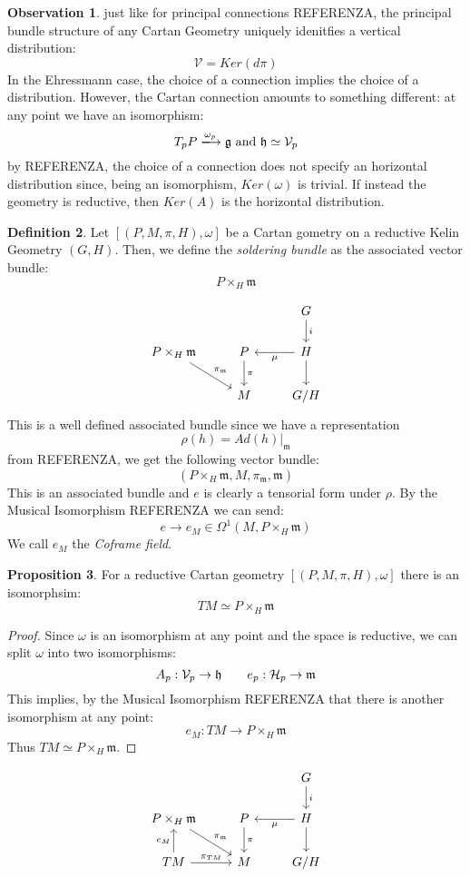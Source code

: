 \documentclass[12pt,a4paper]{report}
\theoremstyle{definition}
\newtheorem{Def}{Definition}[chapter]
\theoremstyle{Theorem}
\newtheorem{Prop}[Def]{Proposition}
\theoremstyle{definition}
\theoremstyle{definition}
\newtheorem{Obs}[Def]{Observation}
\begin{document}
	\begin{Obs}
		just like for principal connections REFERENZA, the principal bundle structure of any Cartan Geometry uniquely idenitfies a vertical distribution:
		$$\mathcal{V}=Ker(d\pi)$$
		In the  Ehressmann case, the choice of a connection implies the choice of a distribution. However, the Cartan connection amounts to something different: at any point we have an isomorphism:
		$$T_pP\xlongrightarrow{\omega_p}\mathfrak{g}\hbox{ and }\mathfrak{h}\simeq\mathcal{V}_p$$ by REFERENZA, the choice of a connection does not specify an horizontal distribution since, being an isomorphism, $Ker(\omega)$ is trivial. If instead the geometry is reductive, then $Ker(A)$ is the horizontal distribution.
	\end{Obs}
	\begin{Def}
		Let $[(P,M,\pi,H),\omega]$ be a Cartan gometry on a reductive Kelin Geometry $(G,H)$. Then, we define the \textit{soldering bundle} as the associated vector bundle:
		$$P\times_{H}\mathfrak{m}$$
	\end{Def}
	$$\begin{tikzcd}
		&& G \arrow{d}{i}\\
		P\times_H \mathfrak{m}\arrow{dr}{\pi_\mathfrak{m}}&P \arrow{d}{\pi} & H \arrow{l}{\mu} \arrow{d}\\
		& M & G/H
	\end{tikzcd}$$
	This is a well defined associated bundle since we have a representation $$\rho(h)=Ad(h)|_\mathfrak{m}$$
	from REFERENZA, we get the following vector bundle:
	$$(P\times_{H}\mathfrak{m},M,\pi_{\mathfrak{m}},\mathfrak{m})$$
	This is an associated bundle and $e$ is clearly a tensorial form under $\rho$. By the Musical Isomorphism REFERENZA we can send:
	$$e\rightarrow e_M\in\Omega^1(M,P\times_{H}\mathfrak{m})$$
	We call $e_M$ the \textit{Coframe field}.
	\begin{Prop}
		For a reductive Cartan geometry $[(P,M,\pi,H),\omega]$ there is an isomorphsim:
		$$TM\simeq P\times_{H}\mathfrak{m}$$
	\end{Prop}
	\begin{proof}
		Since $\omega$ is an isomorphism at any point and the space is reductive, we can split $\omega$ into two isomorphisms:
		$$A_p:\mathcal{V}_p\rightarrow \mathfrak{h}\hspace{ 20 pt }e_p:\mathcal{H}_p\rightarrow \mathfrak{m}$$
		This implies, by the Musical Isomorphism REFERENZA that there is another isomorphism at any point:
		$$e_{M}:TM\rightarrow P\times_H\mathfrak{m}$$
		Thus $TM\simeq P\times_{H}\mathfrak{m}$.
	\end{proof}
	$$\begin{tikzcd}
		&& G \arrow{d}{i}\\
		P\times_H \mathfrak{m}\arrow{dr}{\pi_\mathfrak{m}}&P \arrow{d}{\pi} & H \arrow{l}{\mu} \arrow{d}\\
		TM \arrow{u}{e_M} \arrow{r}{\pi_{TM}}& M & G/H
	\end{tikzcd}$$
\end{document}
